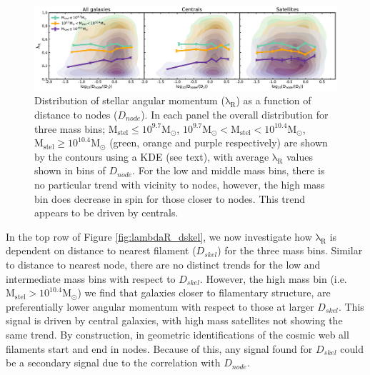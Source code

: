 \begin{figure}
    \centering\includegraphics[width=\linewidth]{thesis/latex/cw_spin/lambdaR_dnode_mass_split_3sigma.pdf}
    \caption{Distribution of stellar angular momentum ($\mathrm{\lambda_R}$) as a function of distance to nodes ($D_{node}$). In each panel the overall distribution for three mass bins; $\mathrm{M_{stel} \leq 10^{9.7} M_{\odot}}$, $\mathrm{10^{9.7}M_{\odot} < M_{stel} < 10^{10.4}M_{\odot}}$, $\mathrm{M_{stel} \geq 10^{10.4}M_{\odot}}$ (green, orange and purple respectively) are shown by the contours using a KDE (see text), with average $\mathrm{\lambda_R}$ values shown in bins of $D_{node}$. For the low and middle mass bins, there is no particular trend with vicinity to nodes, however, the high mass bin does decrease in spin for those closer to nodes. This trend appears to be driven by centrals.}
\label{fig:lambdaR_dnode}
\end{figure} 

In the top row of Figure \ref{fig:lambdaR_dskel}, we now investigate how $\mathrm{\lambda_R}$ is dependent on distance to nearest filament ($D_{skel}$) for the three mass bins. Similar to distance to nearest node, there are no distinct trends for the low and intermediate mass bins with respect to $D_{skel}$. However, the high mass bin (i.e. $\mathrm{M_{stel} > 10^{10.4}M_{\odot}}$) we find that galaxies closer to filamentary structure, are preferentially lower angular momentum with respect to those at larger $D_{skel}$. This signal is driven by central galaxies, with high mass satellites not showing the same trend. By construction, in geometric identifications of the cosmic web all filaments start and end in nodes. Because of this, any signal found for $D_{skel}$ could be a secondary signal due to the correlation with $D_{node}$. 


